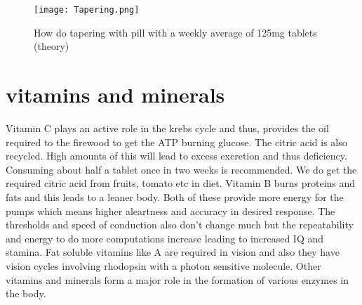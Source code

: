 \documentclass[a4paper]{article}
\begin{document}
\begin{figure}
	\centering
	\texttt{[image: Tapering.png]}
	\caption{\label{fig:Lorenz}How do tapering with pill with a weekly average of 125mg tablets (theory)}
\end{figure}

\section{vitamins and minerals}
Vitamin C plays an active role in the krebs cycle and thus, provides the oil required to the firewood to get the ATP burning glucose. The citric acid is also recycled. High amounts of this will lead to excess excretion and thus deficiency. Consuming about half a tablet once in two weeks is recommended. We do get the required citric acid from fruits, tomato etc in diet. Vitamin B burns proteins and fats and this leads to a leaner body. Both of these provide more energy for the pumps which means higher aleartness and accuracy in desired response. The thresholds and speed of conduction also don't change much but the repeatability and energy to do more computations increase leading to increased IQ and stamina. Fat soluble vitamins like A are required in vision and also they have vision cycles involving rhodopsin with a photon sensitive molecule. Other vitamins and minerals form a major role in the formation of various enzymes in the body.
\end{document}
